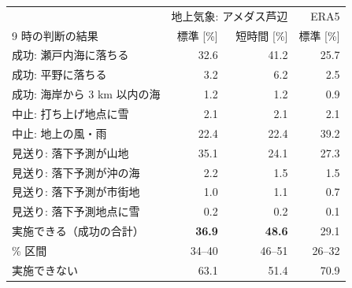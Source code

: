 \begin{tabular}{lrrr}
\toprule
& \multicolumn{2}{c}{地上気象: アメダス芦辺} & ERA5 \\
9 時の判断の結果 & 標準 [\%] & 短時間 [\%] & 標準 [\%] \\
\midrule
成功: 瀬戸内海に落ちる & 32.6 & 41.2 & 25.7 \\
成功: 平野に落ちる & 3.2 & 6.2 & 2.5 \\
成功: 海岸から 3 km 以内の海 & 1.2 & 1.2 & 0.9 \\
中止: 打ち上げ地点に雪 & 2.1 & 2.1 & 2.1 \\
中止: 地上の風・雨 & 22.4 & 22.4 & 39.2 \\
見送り: 落下予測が山地 & 35.1 & 24.1 & 27.3 \\
見送り: 落下予測が沖の海 & 2.2 & 1.5 & 1.5 \\
見送り: 落下予測が市街地 & 1.0 & 1.1 & 0.7 \\
見送り: 落下予測地点に雪 & 0.2 & 0.2 & 0.1 \\
\midrule
実施できる（成功の合計） & \textbf{36.9} & \textbf{48.6} & 29.1 \\
\quad 95\% 区間 & 34--40 & 46--51 & 26--32 \\
実施できない & 63.1 & 51.4 & 70.9 \\
\bottomrule
\end{tabular}
